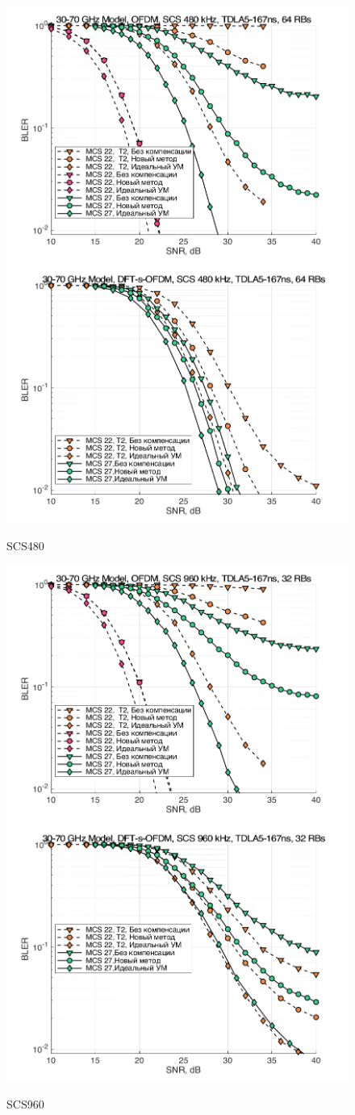 \begin{figure}[h!]
    \centering
    \includegraphics[width=0.49\linewidth]{figs/res/ofdm/OFDM_Nokia_SCS480_MCS22_27.png}
    \includegraphics[width=0.49\linewidth]{figs/res/dftsofdm/DFT-s-OFDM_Nokia_SCS480_MCS22_27.png}
    \caption{SCS480}
    \label{fig:res3070_scs480}
\end{figure}

\begin{figure}[h!]
    \centering
    \includegraphics[width=0.49\linewidth]{figs/res/ofdm/OFDM_Nokia_SCS960_MCS22_27.png}
    \includegraphics[width=0.49\linewidth]{figs/res/dftsofdm/DFT-s-OFDM_Nokia_SCS960_MCS22_27.png}
    \caption{SCS960}
    \label{fig:res3070_scs960}
\end{figure}


